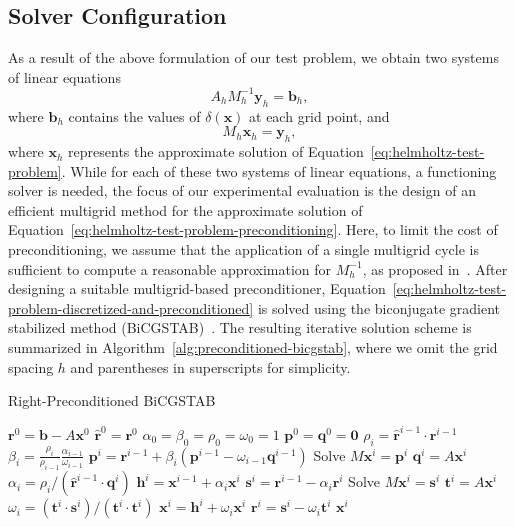 \subsection{Solver Configuration}
\label{sec:solver-configuration-helmholtz}
As a result of the above formulation of our test problem, we obtain two systems of linear equations
\begin{equation}
	A_h M_h^{-1} \bm{y}_h = \bm{b}_h,
	\label{eq:helmholtz-test-problem-discretized-and-preconditioned}
\end{equation}
where $\bm{b}_h$ contains the values of $\delta(\bm{x})$ at each grid point, and
\begin{equation}
	M_h \bm{x}_h = \bm{y}_h,
	\label{eq:helmholtz-test-problem-preconditioning}
\end{equation}
where $\bm{x}_h$ represents the approximate solution of Equation~\eqref{eq:helmholtz-test-problem}.
While for each of these two systems of linear equations, a functioning solver is needed, the focus of our experimental evaluation is the design of an efficient multigrid method for the approximate solution of Equation~\eqref{eq:helmholtz-test-problem-preconditioning}.
Here, to limit the cost of preconditioning, we assume that the application of a single multigrid cycle is sufficient to compute a reasonable approximation for $M_{h}^{-1}$, as proposed in~\cite{erlangga2008advances}.
After designing a suitable multigrid-based preconditioner, Equation~\eqref{eq:helmholtz-test-problem-discretized-and-preconditioned} is solved using the biconjugate gradient stabilized method (BiCGSTAB)~\cite{saad2003iterative}.
The resulting iterative solution scheme is summarized in Algorithm~\ref{alg:preconditioned-bicgstab}, where we omit the grid spacing $h$ and parentheses in superscripts for simplicity.
\begin{algorithm}
	\caption{Right-Preconditioned BiCGSTAB}
	\label{alg:preconditioned-bicgstab}
	\begin{algorithmic}[1] %
			\State $\bm{r}^0 = \bm{b} - A \bm{x}^0$
			\State $\bm{\hat{r}}^0 = \bm{r}^0$
			\State $\alpha_0 = \beta_0 = \rho_0 = \omega_0 = 1$
			\State $\bm{p}^0 = \bm{q}^0 = \bm{0}$
			\State $\rho_i = \bm{\hat{r}}^{i-1} \cdot \bm{r}^{i-1}$
			\State $\beta_i = \frac{\rho_i }{\rho_{i-1} }\frac{\alpha_{i-1}}{ \omega_{i-1}}$
			\State $\bm{p}^i = \bm{r}^{i-1} + \beta_i (\bm{p}^{i-1} - \omega_{i-1} \bm{q}^{i-1})$
			\State Solve $M \bm{x}^i = \bm{p}^i$
			\State $\bm{q}^i = A \bm{x}^i$
			\State $\alpha_i = \rho_i / (\bm{\hat{r}}^{i-1} \cdot \bm{q}^i)$
			\State $\bm{h}^i = \bm{x}^{i-1} + \alpha_i \bm{x}^i$	
			\State $\bm{s}^i = \bm{r}^{i-1} - \alpha_i \bm{r}^i$
			\State Solve $M \bm{x}^i = \bm{s}^i$
			\State $\bm{t}^i = A \bm{x}^i$
			\State $\omega_i = (\bm{t}^i \cdot \bm{s}^i) / (\bm{t}^i \cdot \bm{t}^i)$
			\State $\bm{x}^i = \bm{h}^i + \omega_i \bm{x}^i$
			\State $\bm{r}^i = \bm{s}^i - \omega_i \bm{t}^i$
			\Return $\bm{x}^i$
			\EndIf
			\EndFor
		\end{algorithmic}
\end{algorithm}
